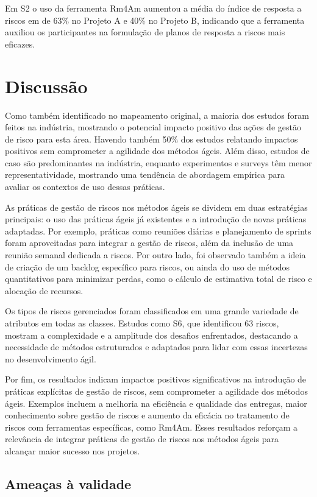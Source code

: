 \documentclass[
	12pt,
	openright,
	twoside,
	a4paper,
	english,
	brazil
	]{abntex2}
\begin{document}
Em S2 o uso da ferramenta Rm4Am aumentou a média do índice de resposta a riscos em de 63\% no Projeto A e 40\% no Projeto B, indicando que a ferramenta auxiliou os participantes na formulação de planos de resposta a riscos mais eficazes.

\section{Discussão}

Como também identificado no mapeamento original, a maioria dos estudos foram feitos na indústria, mostrando o potencial impacto positivo das ações de gestão de risco para esta área. Havendo também 50\% dos estudos relatando impactos positivos sem comprometer a agilidade dos métodos ágeis. Além disso, estudos de caso são predominantes na indústria, enquanto experimentos e surveys têm menor representatividade, mostrando uma tendência de abordagem empírica para avaliar os contextos de uso dessas práticas.

As práticas de gestão de riscos nos métodos ágeis se dividem em duas estratégias principais: o uso das práticas ágeis já existentes e a introdução de novas práticas adaptadas. Por exemplo, práticas como reuniões diárias e planejamento de sprints foram aproveitadas para integrar a gestão de riscos, além da inclusão de uma reunião semanal dedicada a riscos. Por outro lado, foi observado também a ideia de criação de um backlog específico para riscos, ou ainda do uso de métodos quantitativos para minimizar perdas, como o cálculo de estimativa total de risco e alocação de recursos.

Os tipos de riscos gerenciados foram classificados em uma grande variedade de atributos em todas as classes. Estudos como S6, que identificou 63 riscos, mostram a complexidade e a amplitude dos desafios enfrentados, destacando a necessidade de métodos estruturados e adaptados para lidar com essas incertezas no desenvolvimento ágil.

Por fim, os resultados indicam impactos positivos significativos na introdução de práticas explícitas de gestão de riscos, sem comprometer a agilidade dos métodos ágeis. Exemplos incluem a melhoria na eficiência e qualidade das entregas, maior conhecimento sobre gestão de riscos e aumento da eficácia no tratamento de riscos com ferramentas específicas, como Rm4Am. Esses resultados reforçam a relevância de integrar práticas de gestão de riscos aos métodos ágeis para alcançar maior sucesso nos projetos.


\subsection{Ameaças à validade}
\end{document}
